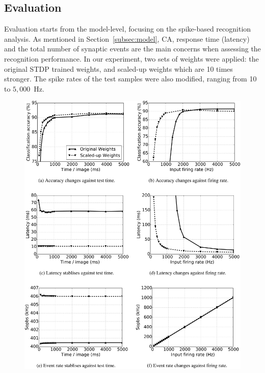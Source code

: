 \subsection{Evaluation}
Evaluation starts from the model-level, focusing on the spike-based recognition analysis.
As mentioned in Section~\ref{subsec:model}, CA, response time (latency) and the total number of synaptic events are the main concerns when assessing the recognition performance.
In our experiment, two sets of weights were applied: the original STDP trained weights, and scaled-up weights which are 10 times stronger.
The spike rates of the test samples were also modified, ranging from 10 to $5,000$~Hz.
\begin{figure}[htb!]
	\centering
	\includegraphics[width=1\textwidth]{pics_bench/fig7.jpg}

\end{figure}
